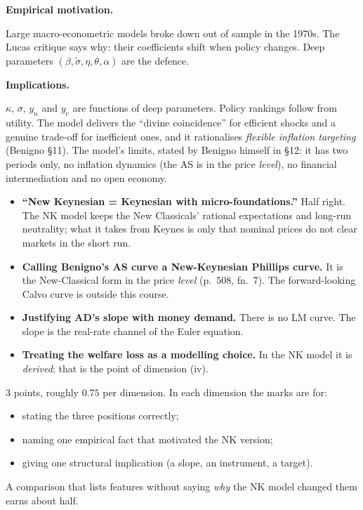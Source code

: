 \documentclass[11pt, a4paper]{article}
\newcommand{\passo}[1]{\medskip\noindent\textbf{#1}\par\nobreak}
\begin{document}
\passo{Empirical motivation.}
Large macro-econometric models broke down out of sample in the 1970s. The Lucas critique
says why: their coefficients shift when policy changes. Deep parameters $(\beta,\tilde\sigma,
\eta,\theta,\alpha)$ are the defence.

\passo{Implications.}
$\kappa$, $\sigma$, $y_n$ and $y_e$ are functions of deep parameters. Policy rankings follow
from utility. The model delivers the ``divine coincidence'' for efficient shocks and a
genuine trade-off for inefficient ones, and it rationalises \emph{flexible inflation
targeting} (Benigno \S11). The model's limits, stated by Benigno himself in \S12: it has two
periods only, no inflation dynamics (the AS is in the price \emph{level}), no financial
intermediation and no open economy.

\begin{tcolorbox}[trapbox, title={Traps in Question 1}]
\small
\begin{itemize}
\item \textbf{``New Keynesian = Keynesian with micro-foundations.''} Half right. The NK model
      keeps the New Classicals' rational expectations and long-run neutrality; what it takes
      from Keynes is only that nominal prices do not clear markets in the short run.
\item \textbf{Calling Benigno's AS curve a New-Keynesian Phillips curve.} It is the
      New-Classical form in the price \emph{level} (p.~508, fn.~7). The forward-looking Calvo
      curve is outside this course.
\item \textbf{Justifying AD's slope with money demand.} There is no LM curve. The slope is
      the real-rate channel of the Euler equation.
\item \textbf{Treating the welfare loss as a modelling choice.} In the NK model it is
      \emph{derived}; that is the point of dimension (iv).
\end{itemize}
\end{tcolorbox}

\begin{tcolorbox}[rubricbox]
\small
3 points, roughly $0.75$ per dimension. In each dimension the marks are for:
\begin{itemize}
\item stating the three positions correctly;
\item naming one empirical fact that motivated the NK version;
\item giving one structural implication (a slope, an instrument, a target).
\end{itemize}
A comparison that lists features without saying \emph{why} the NK model changed them earns
about half.
\end{tcolorbox}
\end{document}
